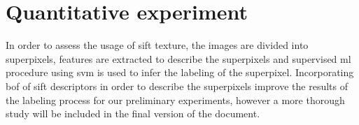 \documentclass[a4paper, 10pt, conference]{llncs}      %
\begin{document}
\section{Quantitative experiment}
In order to assess the usage of \ac{sift} texture, the images are divided into superpixels, features are extracted to describe the superpixels and supervised \ac{ml} procedure using \ac{svm} is used to infer the labeling of the superpixel. Incorporating \ac{bof} of \ac{sift} descriptors in order to describe the superpixels improve the results of the labeling process for our preliminary experiments, however a more thorough study will be included in the final version of the document.



%


\end{document}
